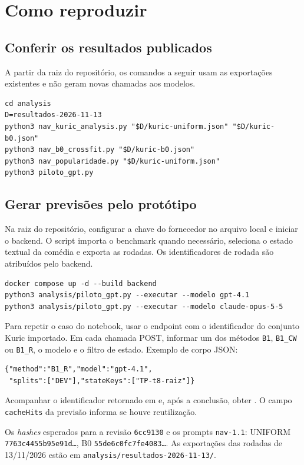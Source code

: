 \documentclass[12pt]{article}
\newcommand{\code}[1]{\texttt{#1}}
\begin{document}
\section{Como reproduzir}
\label{ap:repro}

\subsection{Conferir os resultados publicados}
A partir da raiz do repositório, os comandos a seguir usam as exportações existentes e não geram novas chamadas aos modelos.
\begin{lstlisting}
cd analysis
D=resultados-2026-11-13
python3 nav_kuric_analysis.py "$D/kuric-uniform.json" "$D/kuric-b0.json"
python3 nav_b0_crossfit.py "$D/kuric-b0.json"
python3 nav_popularidade.py "$D/kuric-uniform.json"
python3 piloto_gpt.py
\end{lstlisting}

\subsection{Gerar previsões pelo protótipo}
Na raiz do repositório, configurar a chave do fornecedor no arquivo local  e iniciar o backend. O script importa o benchmark quando necessário, seleciona o estado textual da comédia e exporta as rodadas. Os identificadores de rodada são atribuídos pelo backend.
\begin{lstlisting}
docker compose up -d --build backend
python3 analysis/piloto_gpt.py --executar --modelo gpt-4.1
python3 analysis/piloto_gpt.py --executar --modelo claude-opus-5-5
\end{lstlisting}
Para repetir o caso do notebook, usar o endpoint  com o identificador do conjunto Kuric importado. Em cada chamada POST, informar um dos métodos \code{B1}, \code{B1\_CW} ou \code{B1\_R}, o modelo e o filtro de estado. Exemplo de corpo JSON:
\begin{lstlisting}
{"method":"B1_R","model":"gpt-4.1",
 "splits":["DEV"],"stateKeys":["TP-t8-raiz"]}
\end{lstlisting}
Acompanhar o identificador retornado em  e, após a conclusão, obter . O campo \code{cacheHits} da previsão informa se houve reutilização.


Os \textit{hashes} esperados para a revisão \code{6cc9130} e os prompts \code{nav-1.1}: UNIFORM \code{7763c4455b95e91d\ldots}, B0 \code{55de6c0fc7fe4083\ldots}. As exportações das rodadas de 13/11/2026 estão em \code{analysis/resultados-2026-11-13/}.
\end{document}
